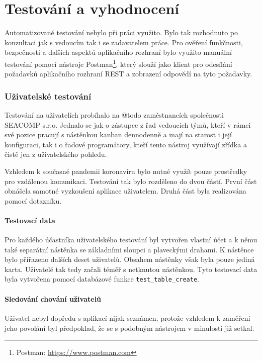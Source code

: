 \chapter{Testování a vyhodnocení}
\blindtext

Automatizované testování nebylo při práci využito. Bylo tak rozhodnuto po konzultaci jak s vedoucím tak i se zadavatelem práce. Pro ověření funkčnosti, bezpečnosti a dalších aspektů aplikačního rozhraní bylo využito manuální testování pomocí nástroje Postman\footnote{Postman: \url{https://www.postman.com}}, který slouží jako klient pro odesílání požadavků aplikačního rozhraní REST a zobrazení odpovědí na tyto požadavky.

\subsection{Uživatelské testování}
Testování na uživatelích probíhalo na @todo zaměstnancích společnosti SEACOMP s.r.o. Jednalo se jak o zástupce z řad vedoucích týmů, kteří v rámci své pozice pracují s nástěnkou kanban dennodenně a mají na starost i její konfiguraci, tak i o řadové programátory, kteří tento nástroj využívají zřídka a čistě jen z uživatelského pohledu.

Vzhledem k současné pandemii koronaviru bylo nutné využít pouze prostředky pro vzdálenou komunikaci. Testování tak bylo rozděleno do dvou částí. První část obnášela samotné vyzkoušení aplikace uživatelem. Druhá část byla realizována pomocí dotazníku.

\subsubsection{Testovací data}
Pro každého účastníka uživatelského testování byl vytvořen vlastní účet a k němu také separátní nástěnka se základními sloupci a plaveckými drahami. K nástěnce bylo přiřazeno dalších deset uživatelů. Obsahem nástěnky však byla pouze jediná karta. Uživatelé tak tedy začali téměř s netknutou nástěnkou. Tyto testovací data byla vytvořena pomocí databázové funkce \texttt{test\_table\_create}.

\subsubsection{Sledování chování uživatelů}
Uživatel nebyl dopředu s aplikací nijak seznámen, protože vzhledem k zaměření jeho povolání byl předpoklad, že se s podobným nástrojem v minulosti již setkal. 

